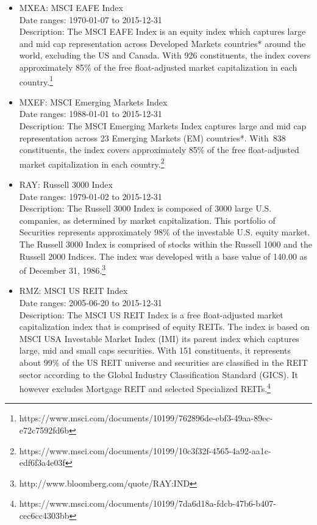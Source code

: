 \documentclass[12pt]{article}
\begin{document}
\begin{itemize}
\item MXEA: MSCI EAFE Index \\
Date ranges: 1970-01-07 to 2015-12-31 \\
Description: The MSCI EAFE Index is an equity index which captures large and mid cap representation across Developed Markets countries* around
the world, excluding the US and Canada. With 926 constituents, the index covers approximately 85\% of the free float-adjusted market
capitalization in each country.\footnote{https://www.msci.com/documents/10199/762896de-ebf3-49aa-89ec-e72c7592fd6b}
\item MXEF: MSCI Emerging Markets Index\\
Date ranges: 1988-01-01 to 2015-12-31 \\
Description: The MSCI Emerging Markets Index captures large and mid cap representation across 23 Emerging Markets (EM) countries*. With 838
constituents, the index covers approximately 85\% of the free float-adjusted market capitalization in each country.\footnote{https://www.msci.com/documents/10199/10c3f32f-4565-4a92-aa1c-edf6f3a4e03f}
\item RAY: Russell 3000 Index\\
Date ranges: 1979-01-02 to 2015-12-31 \\
Description: The Russell 3000 Index is composed of 3000 large U.S. companies, as determined by market capitalization. This portfolio of Securities represents approximately 98\% of the investable U.S. equity market. The Russell 3000 Index is comprised of stocks within the Russell 1000 and the Russell 2000 Indices. The index was developed with a base value of 140.00 as of December 31, 1986.\footnote{http://www.bloomberg.com/quote/RAY:IND}
\item RMZ: MSCI US REIT Index\\
Date ranges: 2005-06-20 to 2015-12-31 \\
Description: The MSCI US REIT Index is a free float-adjusted market capitalization index that is comprised of equity REITs. The index is based on MSCI
USA Investable Market Index (IMI) its parent index which captures large, mid and small caps securities. With 151 constituents, it represents
about 99\% of the US REIT universe and securities are classified in the REIT sector according to the Global Industry Classification Standard
(GICS). It however excludes Mortgage REIT and selected Specialized REITs.\footnote{https://www.msci.com/documents/10199/7da6d18a-fdcb-47b6-b407-cec6cc4303bb}

\end{itemize}
\end{document}
